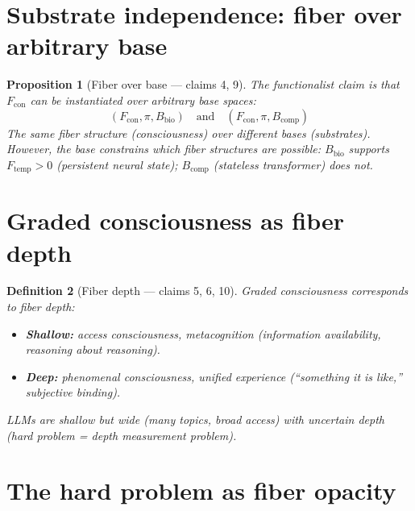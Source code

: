 \documentclass[11pt,a4paper]{article}
\newtheorem{definition}{Definition}[section]
\newtheorem{proposition}[definition]{Proposition}
\begin{document}
\section{Substrate independence: fiber over arbitrary base}

\begin{proposition}[Fiber over base --- claims 4, 9]
\label{prop:substrate}
The functionalist claim is that $F_{\text{con}}$ can be instantiated
over arbitrary base spaces:
\[
  (F_{\text{con}}, \pi, B_{\text{bio}}) \quad \text{and} \quad
  (F_{\text{con}}, \pi, B_{\text{comp}})
\]
The same fiber structure (consciousness) over different bases (substrates).
However, the base constrains which fiber structures are possible:
$B_{\text{bio}}$ supports $F_{\text{temp}} > 0$ (persistent neural state);
$B_{\text{comp}}$ (stateless transformer) does not.
\end{proposition}

\section{Graded consciousness as fiber depth}

\begin{definition}[Fiber depth --- claims 5, 6, 10]
Graded consciousness corresponds to fiber depth:
\begin{itemize}
  \item \textbf{Shallow:} access consciousness, metacognition
    (information availability, reasoning about reasoning).
  \item \textbf{Deep:} phenomenal consciousness, unified experience
    (``something it is like,'' subjective binding).
\end{itemize}
LLMs are shallow but wide (many topics, broad access) with uncertain
depth (hard problem = depth measurement problem).
\end{definition}


\section{The hard problem as fiber opacity}
\label{sec:hard}
\end{document}
